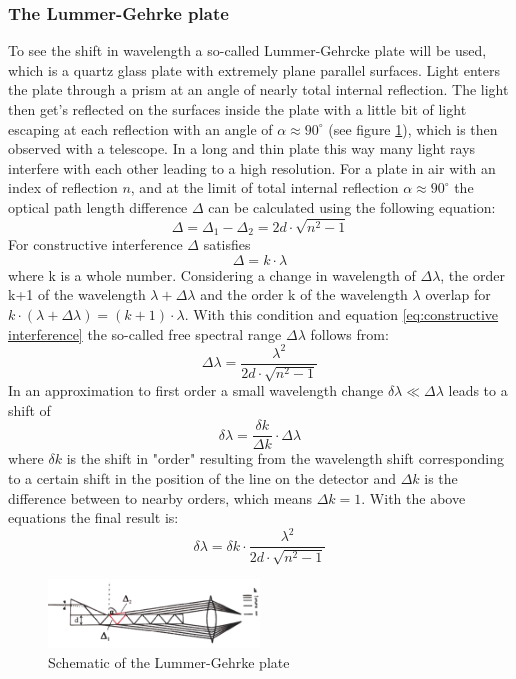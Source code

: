 \documentclass[12pt]{article}
\begin{document}
\subsubsection{The Lummer-Gehrke plate}
To see the shift in wavelength a so-called Lummer-Gehrcke plate  will be used, which is a quartz glass plate with extremely plane parallel surfaces. Light enters the plate through a prism at an angle of nearly total internal reflection. The light then get's reflected on the surfaces inside the plate with a little bit of light escaping at each reflection with an angle of $\alpha \approx 90^\circ$ (see figure \ref{fig:lummergehrke}), which is then observed with a telescope. In a long and thin plate this way many light rays interfere with each other leading to a high resolution. For a plate in air with an index of reflection $n$, and at the limit of total internal reflection $\alpha\approx 90 ^\circ$ the optical path length difference $\Delta$ can be calculated using the following equation:
\begin{equation}
\Delta=\Delta_1-\Delta_2=2d \cdot \sqrt{n^2-1}
\end{equation}
For constructive interference $\Delta$ satisfies
\begin{equation}
\Delta=k\cdot\lambda 
\label{eq:constructive interference}
\end{equation} 
where k is a whole number. Considering a change in wavelength of $\Delta\lambda$, the order k+1 of the wavelength $\lambda+\Delta\lambda$ and the order k of the wavelength $\lambda$ overlap for $k \cdot (\lambda+\Delta\lambda)=(k+1)\cdot\lambda$. With this condition and equation \ref{eq:constructive interference} the so-called free spectral range $\Delta\lambda$ follows from:
\begin{equation}
\Delta\lambda=\frac{\lambda^2}{2d \cdot \sqrt{n^2-1}}
\end{equation}
In an approximation to first order a small wavelength change $\delta\lambda \ll \Delta\lambda$ leads to a shift of 
\begin{equation}
\delta \lambda= \frac{\delta k}{\Delta k} \cdot \Delta\lambda
\end{equation}
where $\delta k$ is the shift in "order" resulting from the wavelength shift corresponding to a certain shift in the position of the line on the detector and $\Delta k$ is the difference between to nearby orders, which means $\Delta k=1$. With the above equations the final result is:
\begin{equation}
\delta\lambda=\delta k \cdot \frac{\lambda^2}{2d\cdot\sqrt{n^2-1}}
\end{equation}
\begin{figure}
\centering
\includegraphics[width=0.5\textwidth]{fig/lummergehrke.png}
\caption{Schematic of the Lummer-Gehrke plate}
\label{fig:lummergehrke}
\end{figure}
\end{document}
